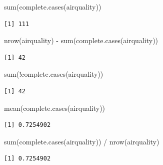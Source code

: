 \documentclass[
  letterpaper,
  DIV=11,
  numbers=noendperiod]{scrreprt}
\newenvironment{Shaded}{\begin{snugshade}}{\end{snugshade}}
\newcommand{\FunctionTok}[1]{\textcolor[rgb]{0.28,0.35,0.67}{#1}}
\newcommand{\NormalTok}[1]{\textcolor[rgb]{0.00,0.23,0.31}{#1}}
\newcommand{\SpecialCharTok}[1]{\textcolor[rgb]{0.37,0.37,0.37}{#1}}
\begin{document}
\begin{Shaded}
\begin{Highlighting}[]
\FunctionTok{sum}\NormalTok{(}\FunctionTok{complete.cases}\NormalTok{(airquality))}
\end{Highlighting}
\end{Shaded}

\begin{verbatim}
[1] 111
\end{verbatim}

\begin{Shaded}
\begin{Highlighting}[]
\FunctionTok{nrow}\NormalTok{(airquality) }\SpecialCharTok{{-}} \FunctionTok{sum}\NormalTok{(}\FunctionTok{complete.cases}\NormalTok{(airquality))}
\end{Highlighting}
\end{Shaded}

\begin{verbatim}
[1] 42
\end{verbatim}

\begin{Shaded}
\begin{Highlighting}[]
\FunctionTok{sum}\NormalTok{(}\SpecialCharTok{!}\FunctionTok{complete.cases}\NormalTok{(airquality))}
\end{Highlighting}
\end{Shaded}

\begin{verbatim}
[1] 42
\end{verbatim}

\begin{Shaded}
\begin{Highlighting}[]
\FunctionTok{mean}\NormalTok{(}\FunctionTok{complete.cases}\NormalTok{(airquality))}
\end{Highlighting}
\end{Shaded}

\begin{verbatim}
[1] 0.7254902
\end{verbatim}

\begin{Shaded}
\begin{Highlighting}[]
\FunctionTok{sum}\NormalTok{(}\FunctionTok{complete.cases}\NormalTok{(airquality)) }\SpecialCharTok{/} \FunctionTok{nrow}\NormalTok{(airquality)}
\end{Highlighting}
\end{Shaded}

\begin{verbatim}
[1] 0.7254902
\end{verbatim}
\end{document}
